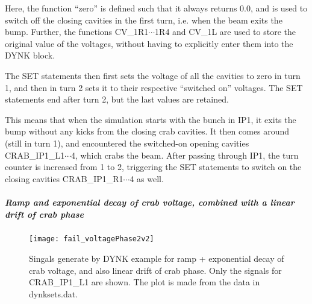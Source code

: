 \documentclass[a4paper,11pt]{report}
\begin{document}
Here, the function ``zero'' is defined such that it always returns 0.0, and is used to switch off the closing cavities in the first turn, i.e. when the beam exits the bump.
Further, the functions CV\_1R1$\cdots$1R4 and CV\_1L are used to store the original value of the voltages, without having to explicitly enter them into the DYNK block.

The SET statements then first sets the voltage of all the cavities to zero in turn 1, and then in turn 2 sets it to their respective ``switched on'' voltages.
The SET statements end after turn 2, but the last values are retained.

This means that when the simulation starts with the bunch in IP1, it exits the bump without any kicks from the closing crab cavities.
It then comes around (still in turn 1), and encountered the switched-on opening cavities CRAB\_IP1\_L1$\cdots$4, which crabs the beam.
After passing through IP1, the turn counter is increased from 1 to 2, triggering the SET statements to switch on the closing cavities CRAB\_IP1\_R1$\cdots$4 as well.

\subparagraph{Ramp and exponential decay of crab voltage, combined with a linear drift of crab phase}
\begin{figure}
  \centering
  \texttt{[image: fail\_voltagePhase2v2]}
  \caption{Singals generate by DYNK example for ramp + exponential decay of crab voltage, and also linear drift of crab phase. Only the signals for CRAB\_IP1\_L1 are shown. The plot is made from the data in dynksets.dat.}
  \label{fig:DYNK_fail}
\end{figure}
\end{document}

